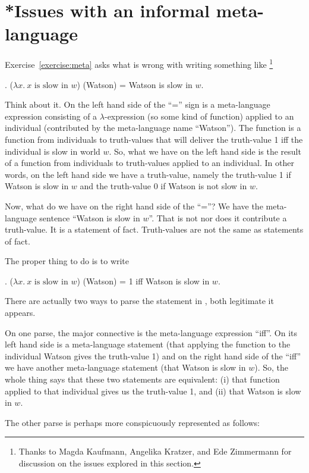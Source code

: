\section{*Issues with an informal meta-language}\label{sec:meta-issues}

Exercise~\ref{exercise:meta} %
%
asks what is wrong with writing something like%
\footnote{Thanks to Magda Kaufmann, Angelika Kratzer, and Ede
  Zimmermann for discussion on the issues explored in this section.}%

\ex. ($\lambda x.\ x \mbox{ is slow in } w$) (Watson) = Watson is slow
in $w$.\label{ex:badwatson}

Think about it. On the left hand side of the ``='' sign is a meta-language
expression consisting of a $\lambda$-expression (so some kind of function)
applied to an individual (contributed by the meta-language name ``Watson''). The
function is a function from individuals to truth-values that will deliver the
truth-value 1 iff the individual is slow in world $w$. So, what we have on the
left hand side is the result of a function from individuals to truth-values
applied to an individual. In other words, on the left hand side we have a
truth-value, namely the truth-value 1 if Watson is slow in $w$ and the
truth-value 0 if Watson is not slow in $w$.

Now, what do we have on the right hand side of the ``=''? We have the
meta-language sentence ``Watson is slow in $w$''. That is not nor does it
contribute a truth-value. It is a statement of fact. Truth-values are not the
same as statements of fact.

The proper thing to do is to write

\ex. ($\lambda x.\ x \mbox{ is slow in } w$) (Watson) = 1 iff Watson
is slow in $w$.\label{ex:goodwatson}

There are actually two ways to parse the statement in \Last, both legitimate it
appears.

On one parse, the major connective is the meta-language expression ``iff''. On
its left hand side is a meta-language statement (that applying the function to
the individual Watson gives the truth-value 1) and on the right hand side of the
``iff'' we have another meta-language statement (that Watson is slow in $w$).
So, the whole thing says that these two statements are equivalent: (i) that
function applied to that individual gives us the truth-value 1, and (ii) that
Watson is slow in $w$.

The other parse is perhaps more conspicuously represented as follows:

